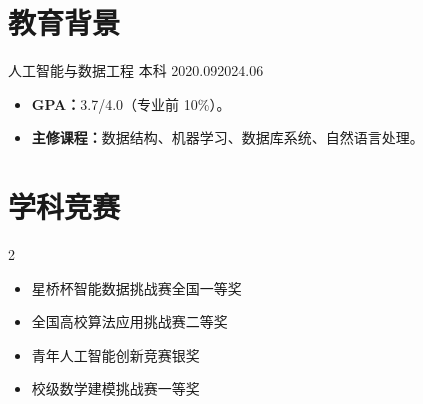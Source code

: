 \documentclass{claritycv}
\begin{document}
\section{教育背景}
  {人工智能与数据工程 \quad 本科}
  {2020.09}{2024.06}
\begin{itemize}
  \item \textbf{GPA：}3.7/4.0（专业前 10\%）。
  \item \textbf{主修课程：}数据结构、机器学习、数据库系统、自然语言处理。
\end{itemize}

\section{学科竞赛}
\begin{multicols}{2}
\begin{itemize}[label={\color{ResumePrimary}\faTrophy}]
  \item 星桥杯智能数据挑战赛全国一等奖
  \item 全国高校算法应用挑战赛二等奖
  \item 青年人工智能创新竞赛银奖
  \item 校级数学建模挑战赛一等奖
\end{itemize}
\end{multicols}
\end{document}
